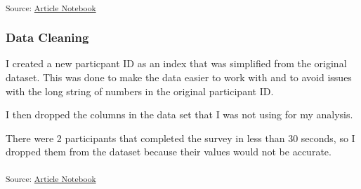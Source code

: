 \documentclass[
  letterpaper,
  DIV=11,
  numbers=noendperiod]{scrartcl}
\begin{document}
\textsubscript{Source:
\href{https://RachelRapier.github.io/psych_755_project/index.qmd.html}{Article
Notebook}}

\subsubsection{Data Cleaning}\label{data-cleaning}

I created a new particpant ID as an index that was simplified from the
original dataset. This was done to make the data easier to work with and
to avoid issues with the long string of numbers in the original
participant ID.

I then dropped the columns in the data set that I was not using for my
analysis.

There were 2 participants that completed the survey in less than 30
seconds, so I dropped them from the dataset because their values would
not be accurate.

\textsubscript{Source:
\href{https://RachelRapier.github.io/psych_755_project/index.qmd.html}{Article
Notebook}}
\end{document}
